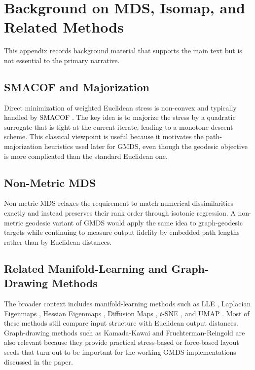 \documentclass[11pt]{article}
\theoremstyle{definition}
\theoremstyle{plain}
\theoremstyle{remark}
\begin{document}
\appendix

\section{Background on MDS, Isomap, and Related Methods}
\label{app:mds_background}

This appendix records background material that supports the main text but is
not essential to the primary narrative.

\subsection{SMACOF and Majorization}
\label{sec:smacof}

Direct minimization of weighted Euclidean stress is non-convex and typically
handled by SMACOF \citep{deleeuw1977applications,deleeuw2009multidimensional}.
The key idea is to majorize the stress by a quadratic surrogate that is tight
at the current iterate, leading to a monotone descent scheme.  This classical
viewpoint is useful because it motivates the path-majorization heuristics used
later for GMDS, even though the geodesic objective is more complicated than the
standard Euclidean one.

\subsection{Non-Metric MDS}
\label{sec:nonmetric_mds}

Non-metric MDS \citep{kruskal1964nonmetric,shepard1962analysis} relaxes the
requirement to match numerical dissimilarities exactly and instead preserves
their rank order through isotonic regression.  A non-metric geodesic variant of
GMDS would apply the same idea to graph-geodesic targets while continuing to
measure output fidelity by embedded path lengths rather than by Euclidean
distances.

\subsection{Related Manifold-Learning and Graph-Drawing Methods}
\label{sec:manifold_learning}

The broader context includes manifold-learning methods such as LLE
\citep{roweis2000nonlinear}, Laplacian Eigenmaps \citep{belkin2003laplacian},
Hessian Eigenmaps \citep{donoho2003hessian}, Diffusion Maps
\citep{coifman2006diffusion}, $t$-SNE \citep{vandermaaten2008tsne}, and UMAP
\citep{mcinnes2018umap}.  Most of these methods still compare input structure
with Euclidean output distances.  Graph-drawing methods such as Kamada-Kawai
\citep{kamada1989algorithm} and Fruchterman-Reingold
\citep{fruchterman1991graph} are also relevant because they provide practical
stress-based or force-based layout seeds that turn out to be important for the
working GMDS implementations discussed in the paper.
\end{document}
